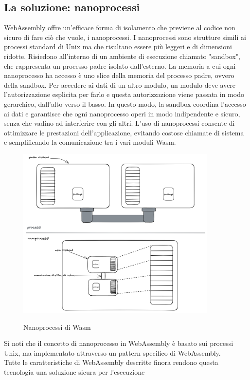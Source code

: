 \subsection{La soluzione: nanoprocessi}
WebAssembly offre un'efficace forma di isolamento che previene al codice non sicuro di fare ciò che vuole, i
nanoprocessi. I nanoprocessi sono strutture simili ai processi standard di Unix ma che risultano essere più leggeri e di
dimensioni ridotte. Risiedono all'interno di un ambiente di esecuzione chiamato "sandbox", che rappresenta un processo
padre isolato dall'esterno. La memoria a cui ogni nanoprocesso ha accesso è uno slice della memoria del processo padre,
ovvero della sandbox. Per accedere ai dati di un altro modulo, un modulo deve avere l'autorizzazione esplicita per farlo
e questa autorizzazione viene passata in modo gerarchico, dall'alto verso il basso. In questo modo, la sandbox coordina
l'accesso ai dati e garantisce che ogni nanoprocesso operi in modo indipendente e sicuro, senza che vadino ad
interferire con gli altri. L'uso di nanoprocessi consente di ottimizzare le prestazioni dell'applicazione, evitando
costose chiamate di sistema e semplificando la comunicazione tra i vari moduli Wasm.
\begin{figure}[h]
    \centering
    \captionsetup{justification=centering}
    \includegraphics[width=10cm]{./chapters/2.wasi-in-depth/images/4.nanoprocesses.png}
    \label{nanoprocesses}
    \caption{Nanoprocessi di Wasm}
\end{figure}
Si noti che il concetto di nanoprocesso in WebAssembly è basato sui processi Unix, ma implementato attraverso un pattern
specifico di WebAssembly.\\
Tutte le caratteristiche di WebAssembly descritte finora rendono questa tecnologia una soluzione sicura per l'esecuzione
